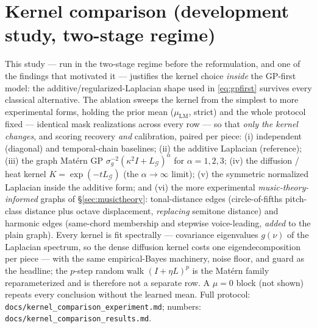 \documentclass[11pt,a4paper]{report}
\newcommand{\graph}{\mathcal{G}}
\newcommand{\Lg}{L_{\graph}}
\newcommand{\muLM}{\mu_{\mathrm{LM}}}  %
\begin{document}
\section{Kernel comparison (development study, two-stage regime)}\label{sec:kernels}
This study --- run in the two-stage regime before the reformulation, and one of the
findings that motivated it --- justifies the kernel choice \emph{inside} the
GP-first model: the additive/regularized-Laplacian shape used in
\eqref{eq:gpfirst} survives every classical alternative. The ablation sweeps the
kernel from the simplest to more experimental forms, holding the prior mean
($\muLM$, strict) and the whole protocol fixed --- identical mask realizations
across every row --- so that \emph{only the kernel changes}, and scoring recovery
\emph{and} calibration, paired per piece:
(i) independent (diagonal) and temporal-chain baselines; (ii) the additive Laplacian
(reference); (iii) the graph Mat\'ern GP $\sigma_g^{-2}(\kappa^2 I + \Lg)^{\alpha}$ for
$\alpha = 1, 2, 3$; (iv) the diffusion / heat kernel $K = \exp(-t\Lg)$ (the
$\alpha\to\infty$ limit); (v) the symmetric normalized Laplacian inside the additive
form; and (vi) the more experimental \emph{music-theory-informed} graphs of
\S\ref{sec:musictheory}: tonal-distance edges (circle-of-fifths pitch-class distance
plus octave displacement, \emph{replacing} semitone distance) and harmonic edges
(same-chord membership and stepwise voice-leading, \emph{added} to the plain graph).
Every kernel is fit spectrally --- covariance eigenvalues $g(\nu)$ of the Laplacian
spectrum, so the dense diffusion kernel costs one eigendecomposition per piece --- with
the same empirical-Bayes machinery, noise floor, and guard as the headline; the
$p$-step random walk $(I+\eta L)^p$ is the Mat\'ern family reparameterized and is
therefore not a separate row. A $\mu = 0$ block (not shown) repeats every conclusion
without the learned mean. Full protocol:
\texttt{docs/kernel\_comparison\_experiment.md}; numbers:
\texttt{docs/kernel\_comparison\_results.md}.
\end{document}
